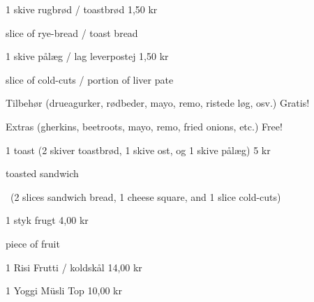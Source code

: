 \documentclass{article}
\begin{document}

\maketitle

\null
\vspace{-0.8cm}


\vspace{0.5cm}

1 skive rugbrød / toastbrød \hfill 1,50 kr

{ slice of rye-bread / toast bread}

\vspace{0.3cm}

1 skive pålæg / lag leverpostej \hfill 1,50 kr

{ slice of cold-cuts / portion of liver pate}

\vspace{0.3cm}

Tilbehør {\large (drueagurker, rødbeder, mayo, remo, ristede løg, osv.)}
\hfill Gratis!

{\english Extras \large (gherkins, beetroots, mayo, remo, fried onions, etc.)}
\hfill  {\english Free!}

\vspace{0.3cm}

1 toast {\large (2 skiver toastbrød, 1 skive ost, og 1 skive pålæg)}
\hfill 5 kr

{ toasted sandwich}
\vspace{-0.1cm}

{\english\large\quad\ (2 slices sandwich bread, 1 cheese square, and 1 slice
cold-cuts)}

\vspace{0.3cm}

1 styk frugt
\hfill 4,00 kr

{ piece of fruit}

\vspace{0.3cm}

1 Risi Frutti / koldskål
\hfill 14,00 kr

\vspace{0.3cm}

1 Yoggi Müsli Top
\hfill 10,00 kr

\vspace{0.3cm}
\end{document}
